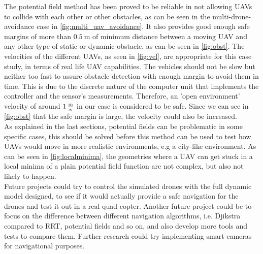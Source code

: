 \documentclass[journal]{IEEEtran}
\begin{document}
	The potential field method has been proved to be reliable in not allowing UAVs to collide with each other or other obstacles, as can be seen in the multi-drone-avoidance case in \figurename{ \ref{fig:multi_uav_avoidance}}. It also provides good enough safe margins of more than $\SI{0.5}{\meter}$ of minimum distance between a moving UAV and any other type of static or dynamic obstacle, as can be seen in \figurename{ \ref{fig:obst}}. The velocities of the different UAVs, as seen in \figurename{ \ref{fig:vel}}, are appropriate for this case study, in terms of real life UAV capabilities. The vehicles should not be slow but neither too fast to assure obstacle detection with enough margin to avoid them in time. This is due to the discrete nature of the computer unit that implements the controller and the sensor's measurements. Therefore, an 'open environment' velocity of around $\SI{1}{\frac{\meter}{\second}}$ in our case is considered to be safe. Since we can see in \figurename{ \ref{fig:obst}} that the safe margin is large, the velocity could also be increased. \\
	
	As explained in the last sections, potential fields can be problematic in some specific cases, this should be solved before this method can be used to test how UAVs would move in more realistic environments, e.g a city-like environment. As can be seen in \figurename{ \ref{fig:localminima}}, the geometries where a UAV can get stuck in a local minima of a plain potential field function are not complex, but also not likely to happen.\\

	Future projects could try to control the simulated drones with the full dynamic model designed, to see if it would actually provide a safe navigation for the drones and test it out in a real quad copter. Another future project could be to focus on the difference between different navigation algorithms, i.e. Djikstra compared to RRT, potential fields and so on, and also develop more tools and tests to compare them. Further research could try implementing smart cameras for navigational purposes.
	
	
\end{document}
